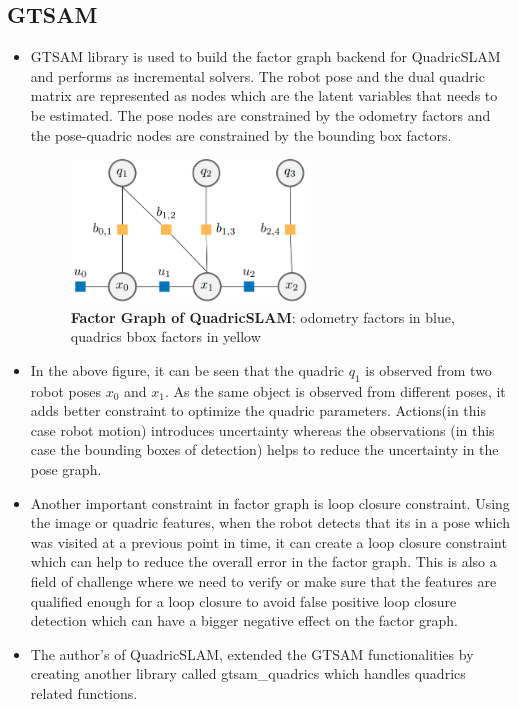 \documentclass{article}
\begin{document}
\subsection{GTSAM}
\begin{itemize}
\item GTSAM\cite{gtsam} library is used to build the factor graph backend for QuadricSLAM and performs as incremental solvers. The robot pose and the dual quadric matrix are represented as nodes which are the latent variables that needs to be estimated. The pose nodes are constrained by the odometry factors and the pose-quadric nodes are constrained by the bounding box factors.

\begin{figure}[H]
\centering
\includegraphics[width=0.6\textwidth, height=0.2\textheight] {Images/factor_graph.png}
\caption{\centering\textbf{Factor Graph of QuadricSLAM}: odometry factors in blue, quadrics bbox factors in yellow \cite{orientation_factor}}
\label{fig:factor_graph}
\end{figure}
\item In the above figure, it can be seen that the quadric $q_1$ is observed from two robot poses $x_0$ and $x_1$. As the same object is observed from different poses, it adds better constraint to optimize the quadric parameters. Actions(in this case robot motion) introduces uncertainty whereas the observations (in this case the bounding boxes of detection) helps to reduce the uncertainty in the pose graph.
\item Another important constraint in factor graph is loop closure constraint. Using the image or quadric features, when the robot detects that its in a pose which was visited at a previous point in time, it can create a loop closure constraint which can help to reduce the overall error in the factor graph. This is also a field of challenge where we need to verify or make sure that the features are qualified enough for a loop closure to avoid false positive loop closure detection which can have a bigger negative effect on the factor graph.
\item The author's of QuadricSLAM, extended the GTSAM functionalities by creating another library called gtsam\_quadrics which handles quadrics related functions.

\end{itemize}
\end{document}
